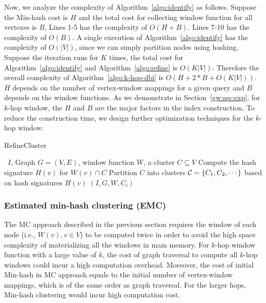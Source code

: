 Now, we analyze the complexity of Algorithm~\ref{algo:identify} as follows.
Suppose the Min-hash cost is $H$ and 
the total cost for collecting window function for all vertexes is $B$, 
Lines 1-5 has the complexity of $O(H + B)$.  
Lines 7-10 has the complexity of $O(B)$. A single execution of Algorithm~\ref{algo:identify}  has the  complexity of $O(|V|)$, since we can simply partition nodes using hashing. Suppose the iteration runs for $K$ times, the total cost for Algorithm~\ref{algo:identify} and Algorithm~\ref{algo:refine} is $O(K|V|)$. Therefore the overall complexity of Algorithm~\ref{algo:k-hop-dbi} is $O(H+2*B + O(K|V|))$. $H$ depends on the number of vertex-window mappings for a given query and $B$ depends on the window functions.
As we demonstrate in Section~\ref{gw:sec:exp}, for $k$-hop window, the $H$ and $B$ are the major factors in the index construction. To reduce the construction time, we design further optimization techniques for the $k$-hop window.


\begin{algorithm}
\caption{RefineCluster}
\begin{algorithmic}[1]
\Require \DBIndex\ $I$, Graph $G=(V,E)$, window function $W$, a cluster $C \subseteq V$
{}
	\State Compute the hash signature $H(v)$ for $W(v) \cap C$
\EndFor
\State Partition $C$ into clusters ${\cal C} = \{C_1,C_2,\cdots\}$ based on hash signatures $H(v)$
	 $(I,G,W,C_i)$
\EndFor
\end{algorithmic}
\label{algo:refine}
\end{algorithm}

\subsubsection{Estimated min-hash clustering (EMC)}
\label{sec:optimized}

The MC approach described in the previous section requires the window of each node (i.e., $W(v), v \in V$)
to be computed twice in order to avoid the high space complexity of materializing all the windows in main memory.
For $k$-hop window function with a large value of $k$, the cost of graph traversal 
to compute all $k$-hop windows
could incur a high computation overhead. Moreover, the cost of initial Min-hash in MC approach equals to the initial number of vertex-window mappings, which is of the same order as graph traversal. For the larger hops, Min-hash clustering would incur high computation cost.

